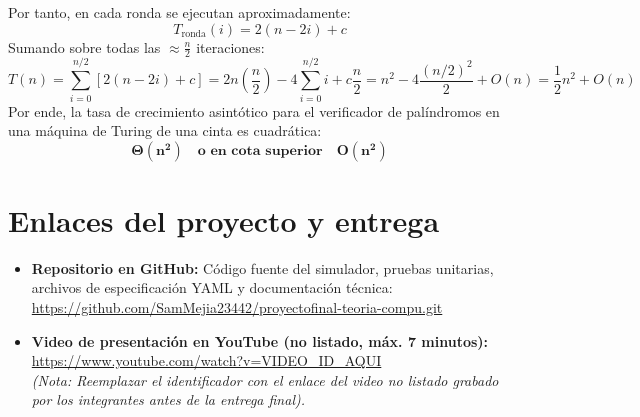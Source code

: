 \documentclass[11pt,letterpaper]{article}
\begin{document}
Por tanto, en cada ronda se ejecutan aproximadamente:
\begin{equation}
T_{\text{ronda}}(i) = 2(n - 2i) + c
\end{equation}
Sumando sobre todas las $\approx \frac{n}{2}$ iteraciones:
\begin{equation}
T(n) = \sum_{i=0}^{n/2} [2(n - 2i) + c] = 2n \left(\frac{n}{2}\right) - 4 \sum_{i=0}^{n/2} i + c \frac{n}{2} = n^2 - 4 \frac{(n/2)^2}{2} + O(n) = \frac{1}{2} n^2 + O(n)
\end{equation}
Por ende, la tasa de crecimiento asintótico para el verificador de palíndromos en una máquina de Turing de una cinta es cuadrática:
\begin{equation}
\mathbf{\Theta(n^2) \quad \text{o en cota superior} \quad O(n^2)}
\end{equation}

\section{Enlaces del proyecto y entrega}

\begin{itemize}
    \item \textbf{Repositorio en GitHub:} Código fuente del simulador, pruebas unitarias, archivos de especificación YAML y documentación técnica:\\[0.2cm]
    \url{https://github.com/SamMejia23442/proyectofinal-teoria-compu.git}
    
    \item \textbf{Video de presentación en YouTube (no listado, máx. 7 minutos):}\\[0.2cm]
    \url{https://www.youtube.com/watch?v=VIDEO_ID_AQUI} \\
    \textit{(Nota: Reemplazar el identificador con el enlace del video no listado grabado por los integrantes antes de la entrega final).}
\end{itemize}

\end{document}
